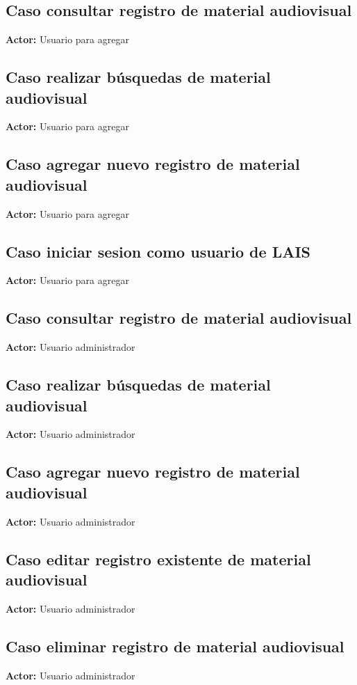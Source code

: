 \documentclass[10pt,letterpaper]{article}
\begin{document}
\subsection{Caso consultar registro de material audiovisual}
\textbf{Actor:} Usuario para agregar

\subsection{Caso realizar búsquedas de material audiovisual}
\textbf{Actor:} Usuario para agregar

\subsection{Caso agregar nuevo registro de material audiovisual}
\textbf{Actor:} Usuario para agregar

\subsection{Caso iniciar sesion como usuario de LAIS}
\textbf{Actor:} Usuario para agregar

\subsection{Caso consultar registro de material audiovisual}
\textbf{Actor:} Usuario administrador

\subsection{Caso realizar búsquedas de material audiovisual}
\textbf{Actor:} Usuario administrador

\subsection{Caso agregar nuevo registro de material audiovisual}
\textbf{Actor:} Usuario administrador

\subsection{Caso editar registro existente de material audiovisual}
\textbf{Actor:} Usuario administrador

\subsection{Caso eliminar registro de material audiovisual}
\textbf{Actor:} Usuario administrador
\end{document}
